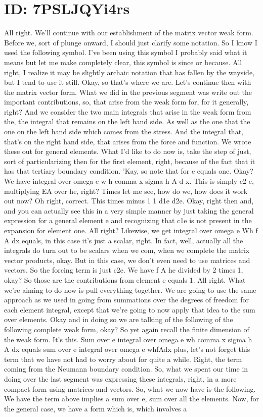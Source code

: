 \documentclass[10pt]{article}
\begin{document}
\section*{ID: 7PSLJQYi4rs}
All right. We'll continue with our establishment of the matrix vector weak form. Before we, sort of plunge onward, I should just clarify some notation. So I know I used the following symbol. I've been using this symbol I probably said what it means but let me make completely clear, this symbol is since or because. All right, I realize it may be slightly archaic notation that has fallen by the wayside, but I tend to use it still. Okay, so that's where we are. Let's continue then with the matrix vector form. What we did in the previous segment was  write out the important contributions, so, that arise from the weak form for, for it generally, right? And we consider the two main integrals that arise in the weak form from the, the integral that remains on the left hand side. As well as the one  that the one on the left hand side which comes from the stress. And the integral that, that's on the right hand side, that arises from the force and function. We wrote these out for general elements. What I'd like to do now is, take the step of just, sort of particularizing then for the first element, right, because of the fact that it has that tertiary boundary condition. 'Kay, so note that for e equals one. Okay? We have integral over omega e w h comma x sigma h A d x. This is simply c2 e, multiplying EA over he, right? Times let me see, how do we, how does it work out now? Oh right, correct. This times minus 1 1 d1e d2e. Okay, right then and, and you can actually see this in a very simple manner by just taking the general expression for a general element e and recognizing that c1e is not present in the expansion for element one. All right? Likewise, we get integral over omega e Wh f A dx equals, in this case it's just a scalar, right. In fact, well, actually all the integrals do turn out to be scalars when we com, when we complete the matrix vector products, okay. But in this case, we don't even need to use matrices and vectors. So the forcing term is just c2e. We have f A he divided by 2 times 1, okay? So those are the contributions from element e equals 1. All right. What we're aiming to do now is pull everything together. We are going to use the same approach as we used in going from summations over the degrees of freedom for each element integral, except that we're going to now apply that idea to the sum over elements. Okay and in doing so we are talking of the following of the following complete weak form, okay? So yet again recall the finite dimension of the weak form. It's this. Sum over e integral over omega e wh comma x sigma h A dx equals sum over e integral over omega e whfAdx plus, let's not forget this term that we have not had to worry about for quite a while. Right, the term coming from the Neumann boundary condition. So, what we spent our time in doing over the last segment was expressing these integrals, right, in a more compact form using matrices and vectors. So, what we now have is the following. We have the term above implies a sum over e, sum over all the elements. Now, for the general case, we have a form which is, which involves a 
\end{document}
